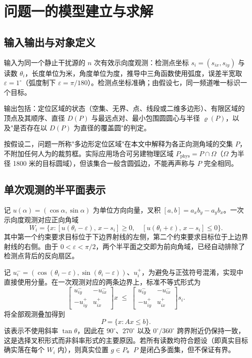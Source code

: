 \section{问题一的模型建立与求解}

\subsection{输入输出与对象定义}

输入为同一个静止干扰源的 $n$ 次有效示向度观测：检测点坐标 $s_i=(s_{ix},s_{iy})$ 与读数 $\theta_i$，长度单位为米，角度单位为度，推导中三角函数使用弧度，误差半宽取 $\varepsilon=1^\circ$（弧度制下 $\varepsilon=\pi/180$）。检测点坐标准确；由假设七，同一频道唯一标识一个目标。

输出包括：定位区域的状态（空集、无界、点、线段或二维多边形）、有限区域的顶点及其顺序、直径 $D(P)$ 与最远点对、最小包围圆圆心与半径 $\varrho(P)$，以及"是否存在以 $D(P)$ 为直径的覆盖圆"的判定。

按假设二，问题一所称"多边形定位区域"在本文中解释为各正向测角域的交集 $P$，不附加任何人为的裁剪框。实际应用场合可另建物理区域 $P_{\text{phys}}=P\cap\Omega$（$\Omega$ 为半径 1800 米的目标圆域），但该集合一般含圆弧边，不能再声称与 $P$ 完全相同。

\subsection{单次观测的半平面表示}

记 $u(\alpha)=(\cos\alpha,\sin\alpha)$ 为单位方向向量，叉积 $[a,b]=a_xb_y-a_yb_x$。一次示向度观测对应正向角域
\begin{equation}
  W_i=\{x:[u(\theta_i-\varepsilon),\,x-s_i]\ge0,\quad [u(\theta_i+\varepsilon),\,x-s_i]\le0\}.
  \label{eq:wedge}
\end{equation}
其中第一个约束要求目标位于下边界射线的左侧，第二个约束要求目标位于上边界射线的右侧。由于 $0<\varepsilon<\pi/2$，两个半平面之交即为前向角域，已经自动排除了检测点背后的反向扇区。

记 $u_i^-=(\cos(\theta_i-\varepsilon),\sin(\theta_i-\varepsilon))$、$u_i^+$，为避免与正弦符号混淆，实现中直接使用分量。在一次观测对应的两条边界上，标准不等式形式为
\begin{equation}
  \begin{bmatrix}u_{iy}^- & -u_{ix}^-\\[2pt] -u_{iy}^+ & u_{ix}^+\end{bmatrix}x
  \;\le\;
  \begin{bmatrix}u_{iy}^- & -u_{ix}^-\\[2pt] -u_{iy}^+ & u_{ix}^+\end{bmatrix}s_i .
  \label{eq:halfplane}
\end{equation}
将全部观测叠加得到
\begin{equation}
  P=\{x:Ax\le b\}.
  \label{eq:P}
\end{equation}
该表示不使用斜率 $\tan\theta$，因此在 $90^\circ$、$270^\circ$ 以及 $0^\circ/360^\circ$ 跨界附近仍保持一致，这是选择叉积形式而非斜率形式的主要原因。若所有读数均符合题设（即真实目标确实落在每个 $W_i$ 内），则真实位置 $g\in P$。$P$ 是闭凸多面集，但不保证有界。

